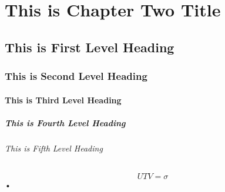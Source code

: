 
\chapter{This is Chapter Two Title}

\section{This is First Level Heading}
\lipsum[1-2]

\subsection{This is Second Level Heading}
\lipsum[3]

\subsubsection{This is Third Level Heading}
\lipsum[4]

\paragraph{This is Fourth Level Heading}
\lipsum[5]

\subparagraph{This is Fifth Level Heading}
\lipsum[6]

\begin{equation}
UTV = \sigma
\end{equation}•